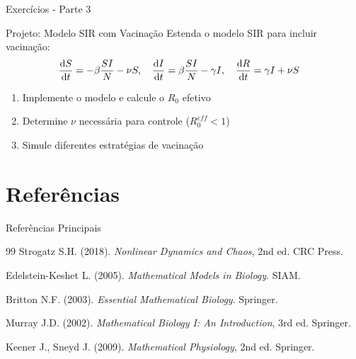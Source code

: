 \begin{frame}[shrink=20]{Exercícios - Parte 3}
\begin{alertblock}{Projeto: Modelo SIR com Vacinação}
Estenda o modelo SIR para incluir vacinação:
\begin{align*}
\frac{\mathrm{d} S}{\mathrm{d} t} &= -\beta \frac{SI}{N} - \nu S, \quad \frac{\mathrm{d} I}{\mathrm{d} t} = \beta \frac{SI}{N} - \gamma I, \quad \frac{\mathrm{d} R}{\mathrm{d} t} = \gamma I + \nu S
\end{align*}
\begin{enumerate}
    \item Implemente o modelo e calcule o $R_0$ efetivo
    \item Determine $\nu$ necessária para controle ($R_0^{eff} < 1$)
    \item Simule diferentes estratégias de vacinação
\end{enumerate}
\end{alertblock}
\end{frame}

\section{Referências}

\begin{frame}{Referências Principais}
\begin{thebibliography}{99}
 Strogatz S.H. (2018). \textit{Nonlinear Dynamics and Chaos}, 2nd ed. CRC Press.

 Edelstein-Keshet L. (2005). \textit{Mathematical Models in Biology}. SIAM.

 Britton N.F. (2003). \textit{Essential Mathematical Biology}. Springer.

 Murray J.D. (2002). \textit{Mathematical Biology I: An Introduction}, 3rd ed. Springer.

 Keener J., Sneyd J. (2009). \textit{Mathematical Physiology}, 2nd ed. Springer.
\end{thebibliography}
\end{frame}

